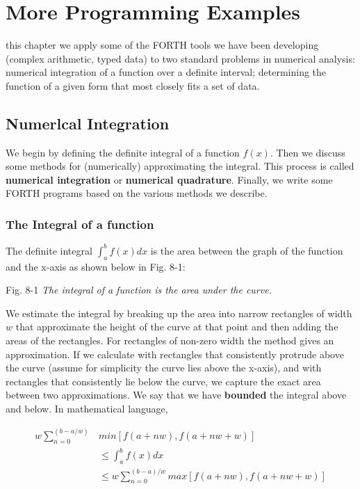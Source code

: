 \chapter{More Programming Examples}
\startcontents[chapters]

 this chapter we apply some of the FORTH tools we have been developing (complex arithmetic, typed data) to two standard problems in numerical analysis: numerical integration of a function over a definite interval; determining the function of a given form that most closely fits a set of data.

\section{Numerlcal Integration}
We begin by defining the definite integral of a function $f(x)$. Then we discuss some methods for (numerically) approximating the integral. This process is called \textbf{numerical integration} or \textbf{numerical quadrature}. Finally, we write some FORTH programs based on the various methods we describe.

\subsection{The Integral of a function}
The definite integral $\int_{a}^{b}f(x) dx$ is the area between the graph of the function and the x-axis as shown below in Fig. 8-1:

Fig. 8-1 \textit{The integral of a function is the area under the curve.}

We estimate the integral by breaking up the area into narrow
rectangles of width $w$ that approximate the height of the curve at that point and then adding the areas of the rectangles. For rectangles of non-zero width the method gives an approximation. If we calculate with rectangles that consistently protrude above the curve (assume for simplicity the curve lies above the x-axis), and with rectangles that consistently lie below the curve, we capture the exact area between two approximations. We say that we have \textbf{bounded} the integral above and below. In mathematical language,

\begin{equation}
\begin{align}
w \sum_{n=0}^{(b-a/w)} &min[f(a+nw),f(a+nw+w)] \\

&\leq \int_{a}^{b}f(x) dx \\

&\leq w \sum_{n=0}^{(b-a)/w} max[f(a+nw),f(a+nw+w)]
\end{align}
\end{equation}

